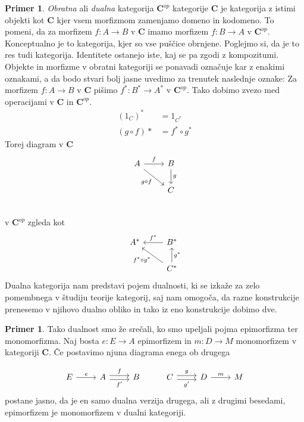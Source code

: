 \documentclass[12pt,a4paper]{book}
\theoremstyle{definition}
\theoremstyle{plain}
\theoremstyle{definition}
\newtheorem{primer}{Primer}[section]
\newtheorem*{primer*}{Primer}
\theoremstyle{remark}
\newcommand{\cat}[1]{\textbf{#1}}
\begin{document}
\begin{primer}
\emph{Obratna} ali \emph{dualna} kategorija $\cat{C}^{op}$ kategorije $\cat{C}$ je kategorija z istimi objekti kot $\cat{C}$ kjer vsem morfizmom zamenjamo domeno in kodomeno. To pomeni, da za morfizem $f : A \to B$ v $\cat{C}$ imamo morfizem $f : B \to A$ v $\cat{C}^{op}$. Konceptualno je to kategorija, kjer so vse puščice obrnjene. Poglejmo si, da je to res tudi kategorija. Identitete ostanejo iste, kaj se pa zgodi z kompozitumi. Objekte in morfizme v obratni kategoriji se ponavadi označuje kar z enakimi oznakami, a da bodo stvari bolj jasne uvedimo za trenutek naslednje oznake: Za morfizem $f : A \to B$ v $\cat{C}$ pišimo $f^* : B^* \to A^*$ v $\cat{C}^{op}$. Tako dobimo zvezo med operacijami v $\cat{C}$ in $\cat{C}^{op}$.
\begin{align*}
(1_C)^* &= 1_{C^*} \\
(g \circ f)* &= f^* \circ g^*
\end{align*}
Torej diagram v $\cat{C}$
\[ \begin{tikzcd}
A \arrow[r, "f"] \arrow[rd, "g \circ f"'] & B \arrow[d, "g"] \\
&	C \\
\end{tikzcd} \]
%
v $\cat{C}^{op}$ zgleda kot
%
\[ \begin{tikzcd}
A^* & \arrow[l, "f^*"'] B^* \\
& \arrow[lu, "f^* \circ g^*"] C^* \arrow[u, "g^*"']
\end{tikzcd} \]
%
Dualna kategorija nam predstavi pojem dualnosti, ki se izkaže za zelo pomembnega v študiju teorije kategorij, saj nam omogoča, da razne konstrukcije prenesemo v njihovo dualno obliko in tako iz eno konstrukcije dobimo dve. 

\begin{primer*}
Tako dualnost smo že srečali, ko smo upeljali pojma epimorfizma ter monomorfizma. Naj bosta $e : E \to A$ epimorfizem in $m : D \to M$ monomorfizem v kategoriji $\cat{C}$. Če postavimo njuna diagrama enega ob drugega

\[ \begin{tikzcd}
E \ar[r, "e"] & A \ar[r, shift left, "f"] \ar[r, shift right, "f'"'] & B & C \ar[r, shift left, "g"] \ar[r, shift right, "g'"'] & D \ar[r, "m"] & M
\end{tikzcd} \]
postane jasno, da je en samo dualna verzija drugega, ali z drugimi besedami, epimorfizem je monomorfizem v dualni kategoriji.
\end{primer*}

\end{primer}
\end{document}
